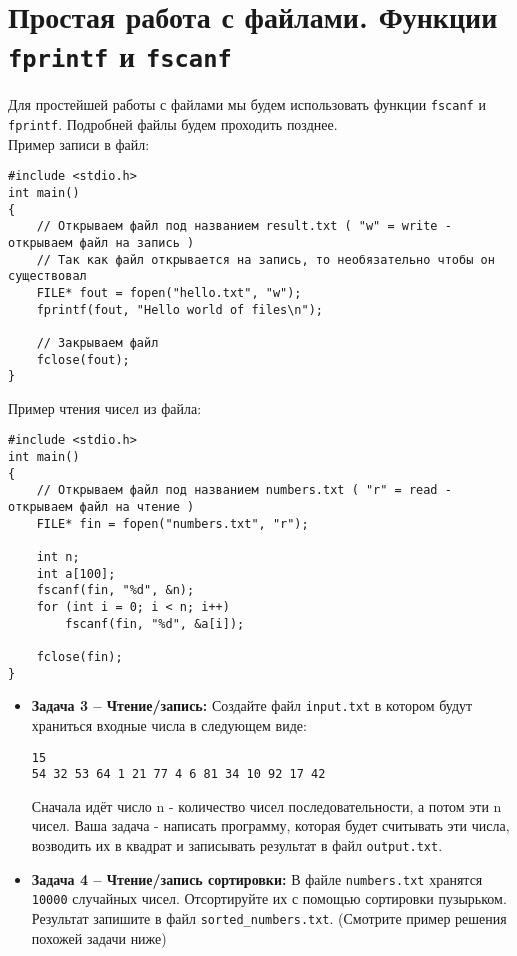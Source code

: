 \documentclass{article}
\begin{document}
\section*{Простая работа с файлами. Функции \texttt{fprintf} и \texttt{fscanf}}
Для простейшей работы с файлами мы будем использовать функции \texttt{fscanf} и \texttt{fprintf}. Подробней файлы будем проходить позднее. \\
Пример записи в файл:
\begin{lstlisting}
#include <stdio.h>
int main()
{
	// Открываем файл под названием result.txt ( "w" = write - открываем файл на запись )
	// Так как файл открывается на запись, то необязательно чтобы он существовал
	FILE* fout = fopen("hello.txt", "w");
	fprintf(fout, "Hello world of files\n");	
		
	// Закрываем файл
	fclose(fout);
}
\end{lstlisting}
Пример чтения чисел из файла:
\begin{lstlisting}
#include <stdio.h>
int main()
{
	// Открываем файл под названием numbers.txt ( "r" = read - открываем файл на чтение )
	FILE* fin = fopen("numbers.txt", "r");
	
	int n;
	int a[100];
	fscanf(fin, "%d", &n);
	for (int i = 0; i < n; i++)
		fscanf(fin, "%d", &a[i]);	
		
	fclose(fin);
}
\end{lstlisting}

\begin{itemize}
\item \textbf{Задача 3 -- Чтение/запись:} Создайте файл \texttt{input.txt} в котором будут храниться входные числа в следующем виде:
\begin{lstlisting}
15
54 32 53 64 1 21 77 4 6 81 34 10 92 17 42
\end{lstlisting}
Сначала идёт число n - количество чисел последовательности, а потом эти n чисел. Ваша задача - написать программу, которая будет считывать эти числа, возводить их в квадрат и записывать результат в файл \texttt{output.txt}.

\item \textbf{Задача 4 -- Чтение/запись сортировки:} В файле \texttt{numbers.txt} хранятся \texttt{10000} случайных чисел. Отсортируйте их с помощью сортировки пузырьком. Результат запишите в файл \texttt{sorted\_numbers.txt}. (Смотрите пример решения похожей задачи ниже)
\end{itemize}
\end{document}
